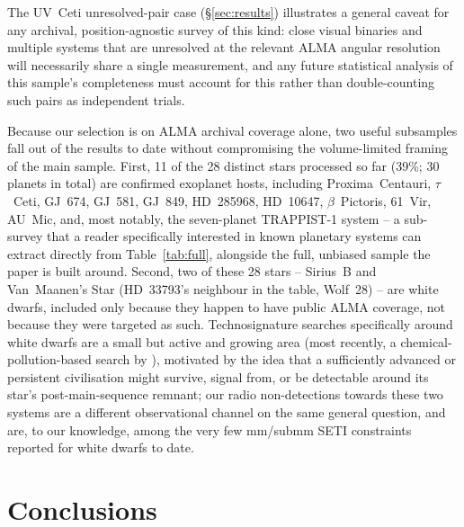 \documentclass{openjournal}
\begin{document}
The UV~Ceti unresolved-pair case (\S\ref{sec:results}) illustrates a
general caveat for any archival, position-agnostic survey of this kind:
close visual binaries and multiple systems that are unresolved at the
relevant ALMA angular resolution will necessarily share a single
measurement, and any future statistical analysis of this sample's
completeness must account for this rather than double-counting such
pairs as independent trials.

Because our selection is on ALMA archival coverage alone, two useful
subsamples fall out of the results to date without compromising the
volume-limited framing of the main sample. First, 11 of the 28 distinct
stars processed so far (39\%; 30 planets in total) are confirmed
exoplanet hosts, including Proxima~Centauri, $\tau$~Ceti, GJ~674,
GJ~581, GJ~849, HD~285968, HD~10647, $\beta$~Pictoris, 61~Vir, AU~Mic,
and, most notably, the seven-planet TRAPPIST-1 system -- a sub-survey
that a reader specifically interested in known planetary systems can
extract directly from Table~\ref{tab:full}, alongside the full, unbiased
sample the paper is built around. Second, two of these 28 stars --
Sirius~B and Van~Maanen's Star (HD~33793's neighbour in the table,
Wolf~28) -- are white dwarfs, included only because they happen to have
public ALMA coverage, not because they were targeted as such.
Technosignature searches specifically around white dwarfs are a small
but active and growing area (most recently, a chemical-pollution-based
search by \citealt{PollutedWD2026}), motivated by the idea that a
sufficiently advanced or persistent civilisation might survive, signal
from, or be detectable around its star's post-main-sequence remnant;
our radio non-detections towards these two systems are a different
observational channel on the same general question, and are, to our
knowledge, among the very few mm/submm SETI constraints reported for
white dwarfs to date.

\section{Conclusions}
\label{sec:conclusions}
\end{document}

